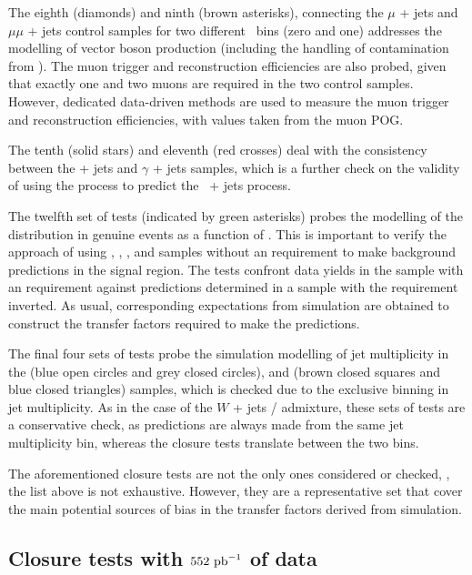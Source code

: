 The eighth (diamonds) and ninth (brown asterisks), connecting the $\mu$
+ jets and $\mu\mu$ + jets control samples for two different \nb~bins
(zero and one) addresses the modelling of vector boson production
(including the handling of contamination from \ttbar). The muon
trigger and reconstruction efficiencies are also probed, given that
exactly one and two muons are required in the two control
samples. However, dedicated data-driven methods are used to measure
the muon trigger and reconstruction efficiencies, with values taken
from the muon POG.

The tenth (solid stars) and eleventh (red crosses) deal with the
consistency between the \zee + jets and $\gamma$ + jets
samples, which is a further check on the validity of using the \gj
process to predict the \znunu\, + jets process.

The twelfth set of tests (indicated by green asterisks) probes the
modelling of the \alphat distribution in genuine \met events as a
function of \scalht. This is important to verify the approach of using
\mj, \ej, \mmj, and \eej samples without an \alphat requirement to
make background predictions in the signal region. The tests confront
data yields in the \mj sample with an \alphat requirement against
predictions determined in a \mj sample with the \alphat requirement
inverted. As usual, corresponding expectations from simulation are
obtained to construct the transfer factors required to make the
predictions.

The final four sets of tests probe the simulation modelling of jet
multiplicity in the \ej (blue open circles and grey closed circles),
and \eej (brown closed squares and blue closed triangles) samples,
which is checked due to the exclusive binning in jet multiplicity.  As
in the case of the $W$ + jets / \ttbar admixture, these sets of tests
are a conservative check, as predictions are always made from the same
jet multiplicity bin, whereas the closure tests translate between the
two bins.

The aforementioned closure tests are not the only ones considered or
checked, \ie, the list above is not exhaustive. However, they are a
representative set that cover the main potential sources of bias in
the transfer factors derived from simulation. 

\subsection{Closure tests with $552~\ipb$ of data}
\label{sec:closure-data-study}

